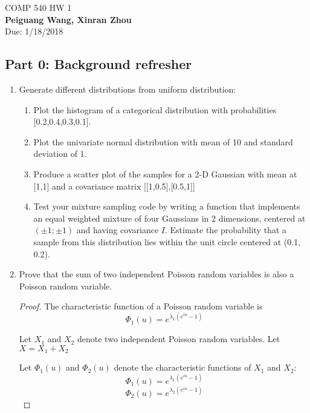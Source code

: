 \documentclass[]{book}
\theoremstyle{definition}
\begin{document}
\begin{center}
{\Large COMP 540 \hspace{0.5cm} HW 1}\\
\textbf{Peiguang Wang, Xinran Zhou}\\ %
Due: 1/18/2018 %
\end{center}

\vspace{0.2 cm}


\subsection*{Part 0: Background refresher}

\begin{enumerate}
\item\label{norms}
Generate different distributions from uniform distribution:
\begin{enumerate}
	\item	Plot the histogram of a categorical distribution with probabilities [0.2,0.4,0.3,0.1].
	\item	Plot the univariate normal distribution with mean of 10 and standard deviation of 1.
	\item	Produce a scatter plot of the samples for a 2-D Gaussian with mean at [1,1] and a covariance matrix [[1,0.5],[0.5,1]]
	\item	Test your mixture sampling code by writing a function that implements an equal weighted mixture of four Gaussians in 2 dimensions, centered at $(\pm 1; \pm 1)$ and having covariance $I$. Estimate the probability that a sample from this distribution lies within the unit circle centered at (0.1, 0.2).
	
\end{enumerate}

\item	Prove that the sum of two independent Poisson random variables is also a Poisson random variable.
\begin{proof}
	The characteristic function of a Poisson random variable is
	$$\varPhi _1(u) = e^{\lambda _1 (e^{iu}-1)}$$
	
	Let $X_1$ and $X_2$ denote two independent Poisson random variables. Let $X=X_1+X_2$
	
	Let $\varPhi _1(u)$ and $\varPhi _2(u)$ denote the characteristic functions of $X_1$ and $X_2$:
	$$\varPhi _1(u) = e^{\lambda _1 (e^{iu}-1)}$$
	$$\varPhi _2(u) = e^{\lambda _2 (e^{iu}-1)}$$
	

\end{proof}
\end{enumerate}
\end{document}
